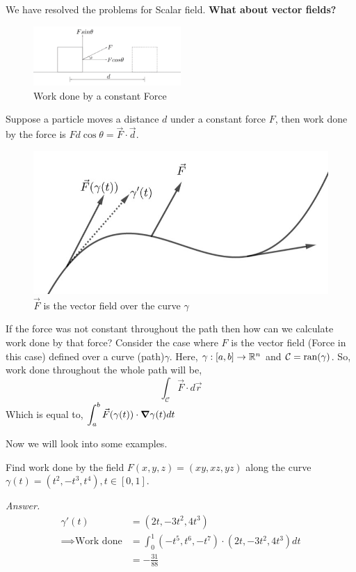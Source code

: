 \documentclass[../Analysis-3]{subfiles}
\begin{document}
We have resolved the problems for Scalar field. \textbf{What about vector fields?}
\begin{figure}[H]
    \centering
    \includegraphics[width=0.5\textwidth]{../figures/lec-23.2.png}
    \caption{Work done by a constant Force}
\end{figure}
Suppose a particle moves a distance $d$ under a constant force $F$, then work done by the force is $Fd\cos{\theta} = \vec{F}\cdot\vec{d}$.


\begin{figure}
    \centering
    \includegraphics[width=.98\linewidth]{../figures/lec-23.3.png}
    \caption{$\vec{F}$ is the vector field over the curve $\gamma$}
\end{figure}

If the force was not constant throughout the path then how can we calculate work done by that force?
Consider the case where $F$ is the vector field (Force in this case) defined over a curve (path)$\gamma$. Here, $\gamma : [a,b] \to \mathbb{R}^n$ and $\mathcal{C} = \operatorname{ran}(\gamma)$. So, work done throughout the whole path will be,
\[\int_{\mathcal{C}} \vec{F}\cdot d\vec{r}\]
Which is equal to, $\displaystyle\int_a^b \vec{F}(\gamma(t))\cdot \grad \gamma(t) dt$

Now we will look into some examples.
\vspace{0.3cm}

\begin{Eg}{}{}
    Find work done by the field $F(x,y,z) = (xy,xz,yz)$ along the curve $\gamma(t) = (t^2,-t^3,t^4),t \in [0,1]$.

    \textit{Answer.} \begin{align*}
        \gamma'(t)
                                  & = (2t,-3t^2,4t^3)                                 \\
        \implies \text{Work done} & = \int_0^1 (-t^5,t^6,-t^7)\cdot(2t,-3t^2,4t^3) dt \\
                                  & = -\frac{31}{88}
    \end{align*}
\end{Eg}
\end{document}
